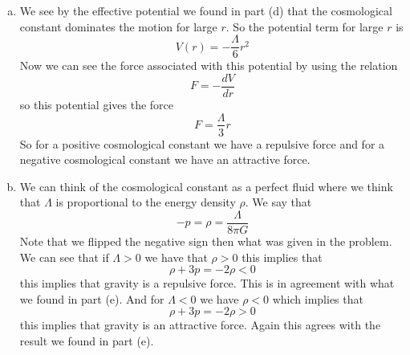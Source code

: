 \documentclass[11pt]{article}
\numberwithin{equation}{section}
\begin{document}
\begin{enumerate}[(a)]
\item
We see by the effective potential we found in part (d) that the cosmological constant dominates the motion for large $r$. So the potential term for large $r$ is
$$V(r) = -\frac{\Lambda}{6}r^2$$
Now we can see the force associated with this potential by using the relation
$$F = -\frac{dV}{dr}$$
so this potential gives the force
$$F = \frac{\Lambda}{3}r$$
So for a positive cosmological constant we have a repulsive force and for a negative cosmological constant we have an attractive force.

\item
We can think of the cosmological constant as a perfect fluid where we think that $\Lambda$ is proportional to the energy density $\rho$. We say that
$$-p = \rho = \frac{\Lambda}{8\pi G}$$
Note that we flipped the negative sign then what was given in the problem. We can see that if $\Lambda>0$ we have that $\rho>0$ this implies that
$$\rho+3p = -2\rho<0$$
this implies that gravity is a repulsive force. This is in agreement with what we found in part (e). And for $\Lambda<0$ we have $\rho<0$ which implies that
$$\rho+3p = -2\rho>0$$
this implies that gravity is an attractive force. Again this agrees with the result we found in part (e).


\end{enumerate}
\end{document}

